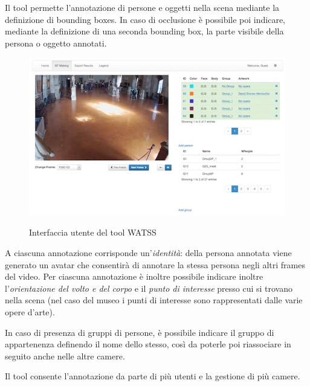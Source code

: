 Il tool permette l'annotazione di persone e oggetti nella scena mediante la definizione di bounding boxes. In caso di occlusione è possibile poi indicare, mediante la definizione di una seconda bounding box, la parte visibile della persona o oggetto annotati.

\begin{figure}[h]
\centering
\includegraphics[width=1\linewidth]{images/watss.jpg}
  \label{fig:watss}
  \caption{Interfaccia utente del tool WATSS}
\end{figure}

A ciascuna annotazione corrisponde un'\emph{identità}: della persona annotata viene generato un avatar che consentirà di annotare la stessa persona negli altri frames del video.
Per ciascuna annotazione è inoltre possibile indicare inoltre l'\emph{orientazione del volto e del corpo} e il \emph{punto di interesse} presso cui si trovano nella scena (nel caso del museo i punti di interesse sono rappresentati dalle varie opere d'arte).

In caso di presenza di gruppi di persone, è possibile indicare il gruppo di appartenenza definendo il nome dello stesso, così da poterle poi riassociare in seguito anche nelle altre camere.

Il tool consente l'annotazione da parte di più utenti e la gestione di più camere.
